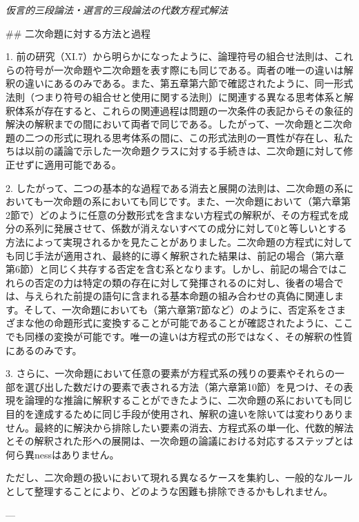 \documentclass[a4paper,11pt,openany]{ltjsbook}
\begin{document}
\begin{center}
\large\textit{仮言的三段論法・選言的三段論法の代数方程式解法}
\end{center}
\vspace{4mm}

\#\# 二次命題に対する方法と過程

1. 前の研究（XI.7）から明らかになったように、論理符号の組合せ法則は、これらの符号が一次命題や二次命題を表す際にも同じである。両者の唯一の違いは解釈の違いにあるのみである。また、第五章第六節で確認されたように、同一形式法則（つまり符号の組合せと使用に関する法則）に関連する異なる思考体系と解釈体系が存在すると、これらの関連過程は問題の一次条件の表記からその象征的解決の解釈までの間において両者で同じである。したがって、一次命題と二次命題の二つの形式に現れる思考体系の間に、この形式法則の一貫性が存在し、私たちは以前の議論で示した一次命題クラスに対する手続きは、二次命題に対して修正せずに適用可能である。

2. したがって、二つの基本的な過程である消去と展開の法則は、二次命題の系においても一次命題の系においても同じです。また、一次命題において（第六章第2節で）どのように任意の分数形式を含まない方程式の解釈が、その方程式を成分の系列に発展させて、係数が消えないすべての成分に対して0と等しいとする方法によって実現されるかを見たことがありました。二次命題の方程式に対しても同じ手法が適用され、最終的に導く解釈された結果は、前記の場合（第六章第6節）と同じく共存する否定を含む系となります。しかし、前記の場合ではこれらの否定の力は特定の類の存在に対して発揮されるのに対し、後者の場合では、与えられた前提の語句に含まれる基本命題の組み合わせの真偽に関連します。そして、一次命題においても（第六章第7節など）のように、否定系をさまざまな他の命題形式に変換することが可能であることが確認されたように、ここでも同様の変換が可能です。唯一の違いは方程式の形ではなく、その解釈の性質にあるのみです。

3. さらに、一次命題において任意の要素が方程式系の残りの要素やそれらの一部を選び出した数だけの要素で表される方法（第六章第10節）を見つけ、その表現を論理的な推論に解釈することができたように、二次命題の系においても同じ目的を達成するために同じ手段が使用され、解釈の違いを除いては変わりありません。最終的に解決から排除したい要素の消去、方程式系の単一化、代数的解法とその解釈された形への展開は、一次命題の論議における対応するステップとは何ら異nessはありません。

ただし、二次命題の扱いにおいて現れる異なるケースを集約し、一般的なルールとして整理することにより、どのような困難も排除できるかもしれません。

---
\end{document}
